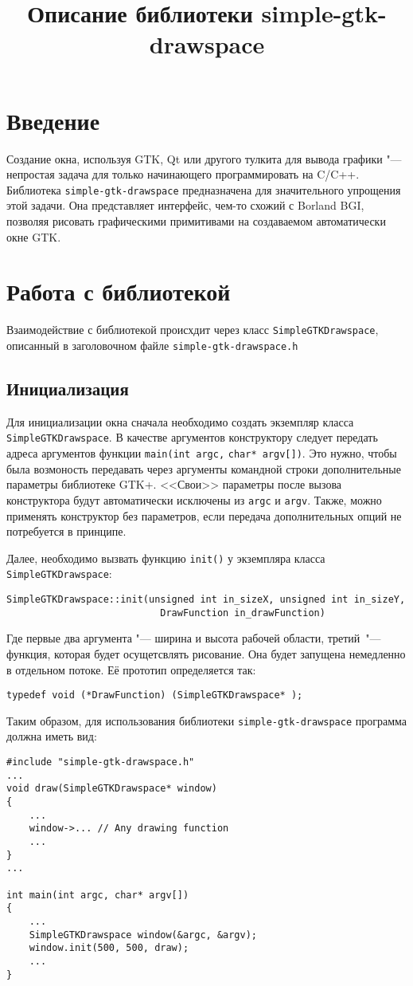 \documentclass[a4paper,11pt]{article}
\title{Описание библиотеки \textbf{simple-gtk-drawspace}}
\begin{document}
\maketitle
\section{Введение}
Создание окна, используя GTK, Qt или другого тулкита для вывода графики "--- непростая задача для только начинающего программировать на C/C++. Библиотека \verb!simple-gtk-drawspace! предназначена для значительного упрощения этой задачи. Она представляет интерфейс, чем-то схожий с Borland BGI, позволяя рисовать графическими примитивами на создаваемом автоматически окне GTK. 
\section{Работа с библиотекой}
Взаимодействие с библиотекой происхдит через класс \verb!SimpleGTKDrawspace!, описанный в заголовочном файле \verb!simple-gtk-drawspace.h!
\subsection{Инициализация}
Для инициализации окна сначала необходимо создать экземпляр класса \verb!SimpleGTKDrawspace!. В качестве аргументов конструктору следует передать адреса аргументов функции \verb!main(int argc,! \verb!char* argv[])!. Это нужно, чтобы была возмоность передавать через аргументы командной строки дополнительные параметры библиотеке GTK+. <<Свои>> параметры после вызова конструктора будут автоматически исключены из \verb!argc! и  \verb!argv!. Также, можно применять конструктор без параметров, если передача дополнительных опций не потребуется в принципе.\par
Далее, необходимо вызвать функцию \verb!init()! у экземпляра класса \verb!SimpleGTKDrawspace!:

\begin{verbatim}
SimpleGTKDrawspace::init(unsigned int in_sizeX, unsigned int in_sizeY,
                           DrawFunction in_drawFunction)
\end{verbatim}
Где первые два аргумента "--- ширина и высота рабочей области, третий~"--- функция, которая будет осущетсвлять рисование. Она будет запущена немедленно в отдельном потоке. Её прототип определяется так:
\begin{verbatim}
typedef void (*DrawFunction) (SimpleGTKDrawspace* );
\end{verbatim}
Таким образом, для использования библиотеки \verb!simple-gtk-drawspace! программа должна иметь вид:
\begin{verbatim}
#include "simple-gtk-drawspace.h"
...
void draw(SimpleGTKDrawspace* window)
{
    ...
    window->... // Any drawing function
    ...
}
...

int main(int argc, char* argv[])
{
    ...
    SimpleGTKDrawspace window(&argc, &argv);
    window.init(500, 500, draw);
    ...
}
\end{verbatim}
\end{document}
